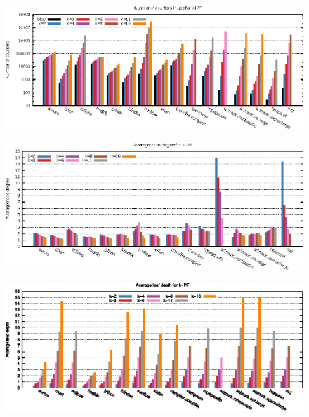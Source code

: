 \ifdefined\noauthorea
\begin{figure}[!ht]
\begin{center}
\includegraphics[width=\textwidth]{figures/kblpp-space-kipf/kblpp-space-kipf.eps}
\caption{\protect}
\end{center}
\end{figure}
\fi

\ifdefined\noauthorea
\begin{figure}[!ht]
\begin{center}
\includegraphics[width=\textwidth]{figures/kblpp-kipf-degree/kblpp-kipf-degree.eps}
\caption{\protect}
\end{center}
\end{figure}
\fi

\ifdefined\noauthorea
\begin{figure}[!ht]
\begin{center}
\includegraphics[width=\textwidth]{figures/kblpp-kipf-leaves/kblpp-kipf-leaves.eps}
\caption{\protect}
\end{center}
\end{figure}
\fi

